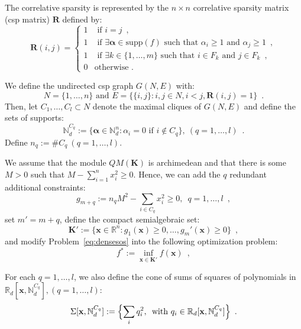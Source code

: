 \documentclass[a4paper,10pt]{article}
\newcommand{\suppf}[1]{\text{supp}(#1)}
\newcommand{\mons}[2]{\N_{#1}^{#2}}
\newcommand{\R}{\mathbb{R}}
\newcommand{\N}{\mathbb{N}}
\newcommand{\x}{\mathbf{x}}
\newcommand{\alphab}{\boldsymbol{\alpha}}
\def\K{\mathbf{K}}
\theoremstyle{plain}
\theoremstyle{definition}
\theoremstyle{remark}
\begin{document}
The correlative sparsity is represented by the 
$n \times n$ correlative sparsity matrix (csp matrix) $\mathbf{R}$ defined by:
\begin{equation}
\label{eq:csp}
\mathbf{R}(i, j) = \left \{
\begin{array}{ll}
  1 & \text{ if }  i = j \enspace, \\
  1 & \text{ if }  \exists \alphab \in \suppf{f} \text{ such that } \alpha_i \geq 1 \text{ and } \alpha_j \geq 1\enspace, \\
  1 & \text{ if }  \exists k \in \{1, \dots, m\} \text{ such that } i \in F_k \text{ and } j \in F_k \enspace,\\
  0 & \text{otherwise .} 
\end{array} \right.
\end{equation}

We define the undirected csp graph $G(N, E)$ with:
 \[ N = \{1, \dots, n\} \text{ and } E = \{ \{i, j\} : i, j \in N, i < j, \mathbf{R}(i, j) = 1 \} \enspace. \]
Then, let $C_1,\dots, C_l \subset N$ denote the maximal cliques of $G(N, E)$ and define the sets of supports: 
\[\mons{d}{C_q} := \{ \alphab \in  \mons{d}{n} : \alpha_i = 0 \text{ if } i \notin C_q \}, \ (q=1 ,\dots,l)\enspace. \]
Define $n_q := \#C_q \ (q=1 ,\dots,l)$.

We assume that the module $QM(\K)$ is archimedean and that there is some $M > 0$ such that $M - \sum_{i = 1}^{n} {x_i^2} \geq 0$. Hence, we can add the $q$ redundant additional constraints:
\begin{equation}
\label{eq:assum_sos_sparse}
g_{m + q} := n_q M^2 - \sum_{i \in C_q} {x_i^2} \geq 0, \enspace q=1 ,\dots, l\enspace,
\end{equation}
set $m' = m + q$, define the compact semialgebraic set:
\[\K' := \{ \x \in \R^{n} : g_1 (\x) \geq 0, \dots, g_m' (\x) \geq 0\}\enspace,\]
and modify Problem~\eqref{eq:densesos} into the following optimization problem:
\begin{equation}
\label{eq:cons_pop_sparse}
f^*  :=  \inf_{\x \in \K'} f (\x)\enspace,
\end{equation}

For each $q=1 ,\dots,l$, we also define the cone of sums of squares of polynomials in $\R_d[\x, \mons{d}{C_q}], (q=1 ,\dots,l)$:
\begin{equation}
\label{eq:cone_sos_sparse}
\Sigma [\x, \mons{d}{C_q}] := \Bigl\{\sum_i q_i^2, \, \text{ with } q_i \in \R_d[\x, \mons{d}{C_q}] \Bigr\}\enspace.
\end{equation}
\end{document}
